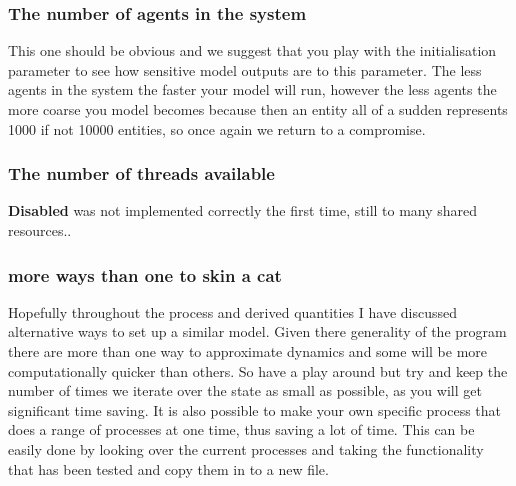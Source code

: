 \subsubsection*{The number of agents in the system} 
This one should be obvious and we suggest that you play with the initialisation parameter  to see how sensitive model outputs are to this parameter. The less agents in the system the faster your model will run, however the less agents the more coarse you model becomes because then an entity all of a sudden represents 1000 if not 10000 entities, so once again we return to a compromise.

\subsubsection*{The number of threads available}
\textbf{Disabled} was not implemented correctly the first time, still to many shared resources.. 

\subsubsection*{more ways than one to skin a cat} 
Hopefully throughout the process and derived quantities I have discussed alternative ways to set up a similar model. Given there generality of the program there are more than one way to approximate dynamics and some will be more computationally quicker than others. So have a play around but try and keep the number of times we iterate over the state as small as possible, as you will get significant time saving. It is also possible to make your own specific process that does a range of processes at one time, thus saving a lot of time. This can be easily done by looking over the current processes and taking the functionality that has been tested and copy them in to a new file.

